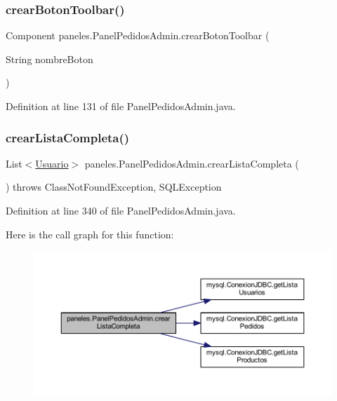 \subsubsection{\texorpdfstring{crear\+Boton\+Toolbar()}{crearBotonToolbar()}}
{\footnotesize\ttfamily Component paneles.\+Panel\+Pedidos\+Admin.\+crear\+Boton\+Toolbar (\begin{DoxyParamCaption}\item[{String}]{nombre\+Boton }\end{DoxyParamCaption})}



Definition at line 131 of file Panel\+Pedidos\+Admin.\+java.

\mbox{\label{classpaneles_1_1_panel_pedidos_admin_a3f0248c018216056a00b353d5f13f097}} 
\subsubsection{\texorpdfstring{crear\+Lista\+Completa()}{crearListaCompleta()}}
{\footnotesize\ttfamily List$<$\mbox{\hyperlink{classobjetos_1_1_usuario}{Usuario}}$>$ paneles.\+Panel\+Pedidos\+Admin.\+crear\+Lista\+Completa (\begin{DoxyParamCaption}{ }\end{DoxyParamCaption}) throws Class\+Not\+Found\+Exception, S\+Q\+L\+Exception}



Definition at line 340 of file Panel\+Pedidos\+Admin.\+java.

Here is the call graph for this function\+:
\nopagebreak
\begin{figure}[H]
\begin{center}
\leavevmode
\includegraphics[width=350pt]{classpaneles_1_1_panel_pedidos_admin_a3f0248c018216056a00b353d5f13f097_cgraph}
\end{center}
\end{figure}
\mbox{\label{classpaneles_1_1_panel_pedidos_admin_a700eb718ad003fd6132347117e6842c2}} 
